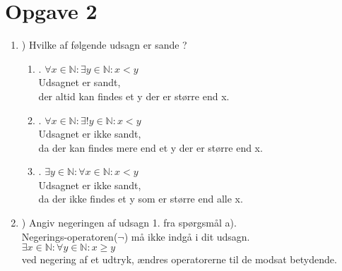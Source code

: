 \documentclass[a4paper,12pt]{article}
\begin{document}
\section{Opgave 2}
\renewcommand{\labelenumi}{\alph{enumi}}
\renewcommand{\labelenumii}{\arabic{enumii}}
\begin{enumerate}
	\item) Hvilke af følgende udsagn er sande ?
\begin{enumerate}
	\item. \( \forall x \in  \mathbb{N}: \exists y \in \mathbb{N}: x < y\)\\

	Udsagnet er sandt,\\
	der altid kan findes et y der er større end x.\\
	
	\item. \(\forall x \in \mathbb{N}:\exists! y \in \mathbb{N}: x < y\)\\
	
	Udsagnet er ikke sandt,\\
	da der kan findes mere end et y der er større end x.\\
	
	\item. \( \exists y \in \mathbb{N}: \forall x \in \mathbb{N}: x < y\)\\
	
	Udsagnet er ikke sandt,\\
	da der ikke findes et y som er større end alle x.\\
	
\end{enumerate}
	\item) Angiv negeringen af udsagn 1. fra spørgsmål a).\\
	Negerings-operatoren($\neg$) må ikke indgå i dit udsagn.\\
	
	\(\exists x \in \mathbb{N}: \forall y \in \mathbb{N}: x \geq y\)\\
	ved negering af et udtryk, ændres operatorerne til de modsat betydende.
	
\end{enumerate}
\end{document}
